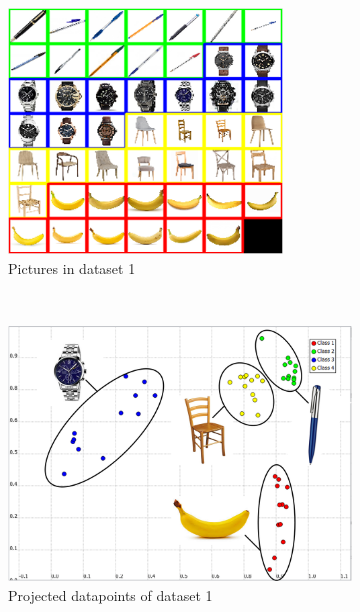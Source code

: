 \documentclass[a4paper,10pt]{article}
\begin{document}
\begin{figure}[H]
\centering
	\begin{subfigure}[t]{0.3\textwidth}
      \centering
      \includegraphics[width=0.8\textwidth]{pictures/dataset_1}
      \caption{Pictures in dataset 1}
      \label{fig:dataset_1}
    \end{subfigure}%
    ~
	\begin{subfigure}[t]{0.3\textwidth}
      \centering
      \includegraphics[width=\textwidth]{pictures/dataset_1_labelized}
      \caption{Projected datapoints of dataset 1}
      \label{fig:dataset_1_labelized}
    \end{subfigure}%
    ~
	\begin{subfigure}[t]{0.3\textwidth}
      \centering

\end{subfigure}
\end{figure}
\end{document}
